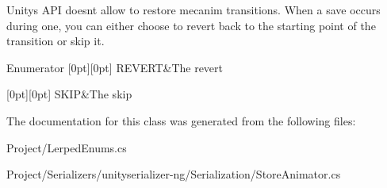 Unity\textquotesingle{}s A\+PI doesn\textquotesingle{}t allow to restore mecanim transitions. When a save occurs during one, you can either choose to revert back to the starting point of the transition or skip it. 

\begin{DoxyEnumFields}{Enumerator}
[0pt][0pt]{}\mbox{\label{class_serialization_1_1_store_animator_aa46e56354c0ab12cff62084f47a71c0eab2ba499cdcc5bd215190b572b4b09042}} 
R\+E\+V\+E\+RT&The revert \\
\hline

[0pt][0pt]{}\mbox{\label{class_serialization_1_1_store_animator_aa46e56354c0ab12cff62084f47a71c0eab85df04e922fe1dd3c1f0692faeaacef}} 
S\+K\+IP&The skip \\
\hline

\end{DoxyEnumFields}


The documentation for this class was generated from the following files\+:\begin{DoxyCompactItemize}
\item 
Project/Lerped\+Enums.\+cs\item 
Project/\+Serializers/unityserializer-\/ng/\+Serialization/Store\+Animator.\+cs\end{DoxyCompactItemize}
